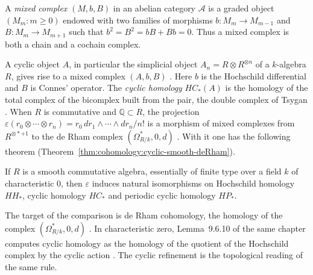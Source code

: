 \begin{definition}\label{def:cohomology:mixed-complex}
A \emph{mixed complex} $(M,b,B)$ in an abelian category
$\mathcal{A}$ is a graded object $(M_m\colon m\geq0)$ endowed with two
families of morphisms $b\colon M_m\to M_{m-1}$ and $B\colon M_m\to M_{m+1}$
such that $b^2=B^2=bB+Bb=0$. Thus a mixed complex is both a chain and a
cochain complex.
\end{definition}

A cyclic object $A$, in particular the simplicial object $A_n=R\otimes
R^{\otimes n}$ of a $k$-algebra $R$, gives rise to a mixed complex $(A,b,B)$
\cite[\S9.8, p.~345]{Weibel1994}. Here $b$ is the Hochschild differential and
$B$ is Connes' operator. The \emph{cyclic homology} $HC_*(A)$ is the homology
of the total complex of the bicomplex built from the pair, the double complex
of Tsygan \cite[Definition~9.6.7, p.~334]{Weibel1994}. When $R$ is commutative
and $\mathbb{Q}\subset R$, the projection $\varepsilon(r_0\otimes\cdots\otimes
r_n)=r_0\,dr_1\wedge\cdots\wedge dr_n/n!$ is a morphism of mixed complexes
from $R^{\otimes\ast+1}$ to the de Rham complex $(\Omega^*_{R/k},0,d)$
\cite[9.8.12, p.~351]{Weibel1994}. With it one has the following theorem
(Theorem~\ref{thm:cohomology:cyclic-smooth-deRham}).

\begin{theorem}\label{thm:cohomology:cyclic-smooth-deRham}
If $R$ is a smooth commutative algebra, essentially of finite type over a
field $k$ of characteristic $0$, then $\varepsilon$ induces natural
isomorphisms on Hochschild homology $HH_*$, cyclic homology $HC_*$ and
periodic cyclic homology $HP_*$.
\end{theorem}

The target of the comparison is de Rham cohomology, the homology of the
complex $(\Omega^*_{R/k},0,d)$ \cite[9.8.9, p.~350]{Weibel1994}. In
characteristic zero, Lemma~9.6.10 of the same chapter computes cyclic homology
as the homology of the quotient of the Hochschild complex by the cyclic action
\cite[Lemma~9.6.10, p.~335]{Weibel1994}. The cyclic refinement is the
topological reading of the same rule.
